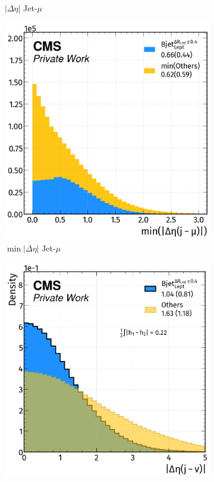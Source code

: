 \begin{figure}[H]
\begin{subfigure}{0.49\linewidth}
        \caption{$|\Delta \eta|$ Jet-$\mu$}
    \end{subfigure}
    \hfill
    \begin{subfigure}{0.47\linewidth}  
        \centering
        \includegraphics[width=1\linewidth]{fig//chap08-kin_reco/min_deta_mu.png}
        \caption{$\min|\Delta \eta|$ Jet-$\mu$}
    \end{subfigure}  
    \hfill
    \begin{subfigure}{0.49\linewidth}
        \centering
        \includegraphics[width=1\linewidth]{fig//chap08-kin_reco/deta_nu.png}

\end{subfigure}
\end{figure}
